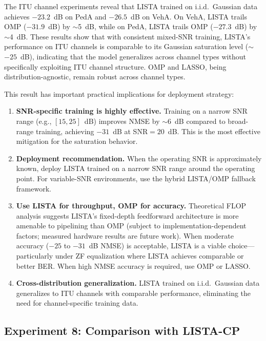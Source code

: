 \documentclass[a4paper,fleqn]{cas-sc}
\begin{document}
The ITU channel experiments reveal that LISTA trained on i.i.d.~Gaussian data achieves $-23.2$~dB on PedA and $-26.5$~dB on VehA. On VehA, LISTA trails OMP ($-31.9$~dB) by $\sim$5~dB, while on PedA, LISTA trails OMP ($-27.3$~dB) by $\sim$4~dB. These results show that with consistent mixed-SNR training, LISTA's performance on ITU channels is comparable to its Gaussian saturation level ($\sim$$-25$~dB), indicating that the model generalizes across channel types without specifically exploiting ITU channel structure. OMP and LASSO, being distribution-agnostic, remain robust across channel types.

This result has important practical implications for deployment strategy:

\begin{enumerate}
\item \textbf{SNR-specific training is highly effective.} Training on a narrow SNR range (e.g., $[15, 25]$~dB) improves NMSE by $\sim$6~dB compared to broad-range training, achieving $-31$~dB at SNR$=20$~dB. This is the most effective mitigation for the saturation behavior.

\item \textbf{Deployment recommendation.} When the operating SNR is approximately known, deploy LISTA trained on a narrow SNR range around the operating point. For variable-SNR environments, use the hybrid LISTA/OMP fallback framework.

\item \textbf{Use LISTA for throughput, OMP for accuracy.} Theoretical FLOP analysis suggests LISTA's fixed-depth feedforward architecture is more amenable to pipelining than OMP (subject to implementation-dependent factors; measured hardware results are future work). When moderate accuracy ($-25$ to $-31$~dB NMSE) is acceptable, LISTA is a viable choice---particularly under ZF equalization where LISTA achieves comparable or better BER. When high NMSE accuracy is required, use OMP or LASSO.

\item \textbf{Cross-distribution generalization.} LISTA trained on i.i.d.~Gaussian data generalizes to ITU channels with comparable performance, eliminating the need for channel-specific training data.
\end{enumerate}

\subsection{Experiment 8: Comparison with LISTA-CP}\label{sec:exp_lista_cp}
\end{document}
